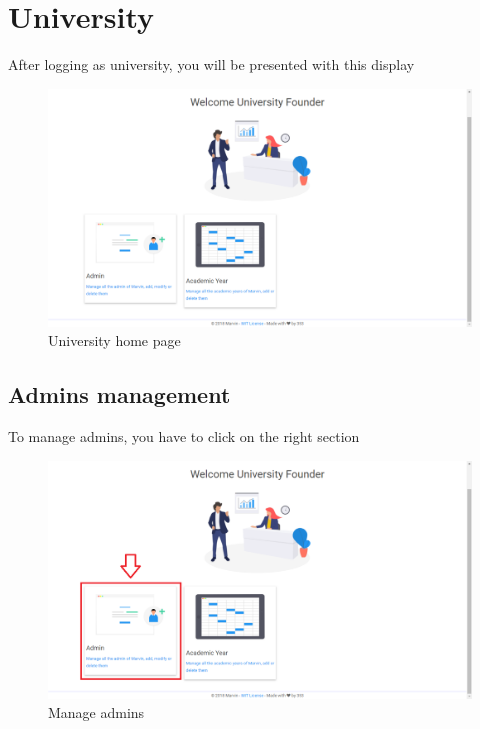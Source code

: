 \documentclass[ManualeUtente]{subfiles}
\begin{document}
\chapter{University}
After logging as university, you will be presented with this display 
\begin{figure}[H]
	\centering
	\includegraphics[width=0.7\linewidth]{./image/University}
	\caption[University]{University home page}
	\label{fig:university1}
\end{figure}
\newpage
\section{Admins management}
To manage admins, you have to click on the right section\\
\begin{figure}[H]
	\centering
	\includegraphics[width=0.7\linewidth]{./image/UniAdmin}
	\caption[Manage admin]{Manage admins}
	\label{fig:uniadmin}
\end{figure}
\end{document}

